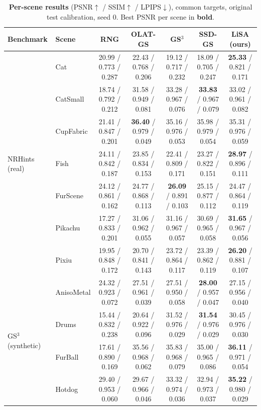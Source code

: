 \begin{table}[t]
\caption{\textbf{Per-scene results} (PSNR$\uparrow$ / SSIM$\uparrow$ / LPIPS$\downarrow$), common targets, original test calibration, seed 0. Best PSNR per scene in \textbf{bold}.}
\label{tab:perscene}
\centering\scriptsize
\setlength{\tabcolsep}{3pt}
\begin{tabular}{@{}llccccc@{}}
\toprule
Benchmark & Scene & RNG & OLAT-GS & GS$^3$ & SSD-GS & \textbf{LiSA (ours)} \\
\midrule
\multirow{7}{*}{NRHints (real)} & Cat & 20.99 / 0.773 / 0.287 & 22.43 / 0.768 / 0.206 & 19.12 / 0.717 / 0.232 & 18.09 / 0.705 / 0.247 & \textbf{25.33} / 0.821 / 0.171 \\
 & CatSmall & 18.74 / 0.792 / 0.212 & 31.58 / 0.949 / 0.081 & 33.28 / 0.967 / 0.076 & \textbf{33.83} / 0.967 / 0.079 & 33.02 / 0.961 / 0.082 \\
 & CupFabric & 21.41 / 0.847 / 0.201 & \textbf{36.40} / 0.979 / 0.049 & 35.16 / 0.976 / 0.053 & 35.98 / 0.979 / 0.054 & 35.31 / 0.976 / 0.059 \\
 & Fish & 24.11 / 0.842 / 0.187 & 23.85 / 0.834 / 0.153 & 22.41 / 0.809 / 0.171 & 23.27 / 0.822 / 0.151 & \textbf{28.97} / 0.896 / 0.111 \\
 & FurScene & 24.12 / 0.861 / 0.162 & 24.77 / 0.868 / 0.113 & \textbf{26.09} / 0.891 / 0.103 & 25.15 / 0.877 / 0.112 & 24.47 / 0.864 / 0.119 \\
 & Pikachu & 17.27 / 0.833 / 0.201 & 31.06 / 0.962 / 0.055 & 31.16 / 0.967 / 0.057 & 30.69 / 0.965 / 0.058 & \textbf{31.65} / 0.967 / 0.056 \\
 & Pixiu & 19.95 / 0.848 / 0.172 & 20.70 / 0.841 / 0.143 & 23.72 / 0.864 / 0.117 & 23.39 / 0.862 / 0.119 & \textbf{26.20} / 0.881 / 0.107 \\
\midrule
\multirow{6}{*}{GS$^3$ (synthetic)} & AnisoMetal & 24.32 / 0.923 / 0.072 & 27.51 / 0.961 / 0.039 & 27.51 / 0.950 / 0.058 & \textbf{28.00} / 0.957 / 0.047 & 27.15 / 0.956 / 0.040 \\
 & Drums & 15.44 / 0.832 / 0.238 & 20.64 / 0.922 / 0.096 & 31.52 / 0.976 / 0.029 & \textbf{31.54} / 0.976 / 0.029 & 30.45 / 0.976 / 0.030 \\
 & FurBall & 17.61 / 0.890 / 0.169 & 35.56 / 0.968 / 0.062 & 35.83 / 0.968 / 0.079 & 35.00 / 0.965 / 0.086 & \textbf{36.11} / 0.971 / 0.054 \\
 & Hotdog & 29.40 / 0.953 / 0.060 & 29.67 / 0.966 / 0.046 & 33.32 / 0.974 / 0.036 & 32.94 / 0.973 / 0.037 & \textbf{35.22} / 0.980 / 0.029 \\

\end{tabular}
\end{table}
